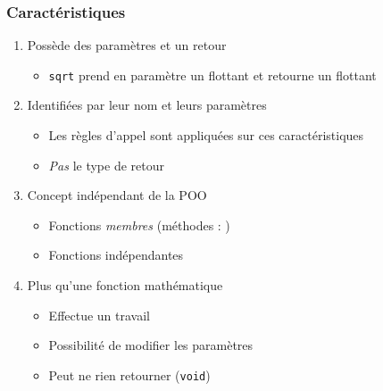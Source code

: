 \begin{frame}
\frametitle{Caractéristiques}
\begin{enumerate}[<+->]
\item Possède des paramètres et un retour
	\begin{itemize}
	\item \texttt{sqrt} prend en paramètre un flottant et retourne un flottant
	\end{itemize}
\item Identifiées par leur nom et leurs paramètres
	\begin{itemize}
	\item Les règles d'appel sont appliquées sur ces caractéristiques
	\item \emph{Pas} le type de retour
	\end{itemize}
\item Concept indépendant de la POO
	\begin{itemize}
	\item Fonctions \emph{membres} (méthodes : \cpp)
	\item Fonctions indépendantes
	\end{itemize}
\item Plus qu'une fonction mathématique
	\begin{itemize}
	\item Effectue un travail
	\item Possibilité de modifier les paramètres
	\item Peut ne rien retourner (\lstinline|void|)
	\end{itemize}
\end{enumerate}
\end{frame}

